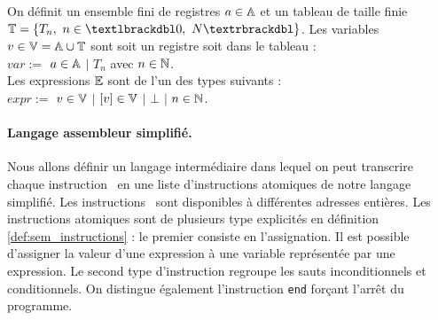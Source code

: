 \begin{defi}
On définit un ensemble fini de registres $a\in\mathbb A$ et un tableau de taille finie $\BT=\{T_n,\ n\in\textlbrackdbl 0,\ N\textrbrackdbl\}$. Les variables $v\in\mathbb V=\mathbb A\cup\mathbb T$ sont soit un registre soit dans le tableau :\\
$var:=$ $a\in\mathbb A$ $|$ $T_n$ avec $n\in\mathbb N$.\\
Les expressions $\mathbb E$ sont de l'un des types suivants :\\
$expr:=$ $v\in\mathbb V$ $|$ $[v]\in\mathbb V$ $|$ $\bot$ $|$ $n\in\mathbb N$.%
\label{def:sem_conc_var}
\end{defi}


\paragraph{Langage assembleur simplifié.} Nous allons définir un langage intermédiaire dans lequel on peut transcrire chaque instruction \xq\ en une liste d'instructions atomiques de notre langage simplifié.
Les instructions \xq\ sont disponibles à différentes adresses entières. 
Les instructions atomiques sont de plusieurs type explicités en définition \ref{def:sem_instructions} : le premier consiste en l'assignation.
Il est possible d'assigner la valeur d'une expression à une variable représentée par une expression. 
Le second type d'instruction regroupe les sauts inconditionnels et conditionnels.
On distingue également l'instruction \texttt{end} forçant l'arrêt du programme.

